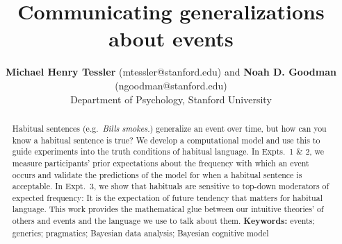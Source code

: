 \documentclass[10pt,letterpaper]{article}
\title{Communicating generalizations about events}
\author{{\large \bf Michael Henry Tessler} (mtessler@stanford.edu) and
 {\large \bf Noah D. Goodman} (ngoodman@stanford.edu) \\
  Department of Psychology, Stanford University}
\newcommand{\ndg}[1]{\textcolor{Green}{[ndg: #1]}}
\begin{document}
\maketitle


\begin{abstract}
Habitual sentences (e.g.~\emph{Bills smokes.}) generalize an event over time, but how can you know a habitual sentence is true?
We develop a computational model and use this to guide experiments into the truth conditions of habitual language.
In Expts.~1 \& 2, we measure participants' prior expectations about the frequency with which an event occurs and validate the predictions of the model for when a habitual sentence is acceptable.
In Expt.~3, we show that habituals are sensitive to top-down moderators of expected frequency: It is the expectation of future tendency that matters for habitual language.
This work provides the mathematical glue between our intuitive theories' of others and events and the language we use to talk about them.
\textbf{Keywords:} 
events; generics; pragmatics; Bayesian data analysis; Bayesian cognitive model
\end{abstract}
\end{document}
